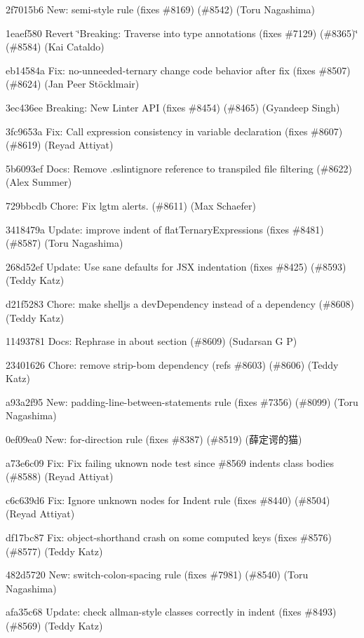 \begin{DoxyItemize}
\item 2f7015b6 New\+: semi-\/style rule (fixes \#8169) (\#8542) (Toru Nagashima)
\item 1eaef580 Revert \char`\"{}\+Breaking\+: Traverse into type annotations (fixes \#7129) (\#8365)\char`\"{} (\#8584) (Kai Cataldo)
\item eb14584a Fix\+: no-\/unneeded-\/ternary change code behavior after fix (fixes \#8507) (\#8624) (Jan Peer Stöcklmair)
\item 3ec436ee Breaking\+: New Linter A\+PI (fixes \#8454) (\#8465) (Gyandeep Singh)
\item 3fc9653a Fix\+: Call expression consistency in variable declaration (fixes \#8607) (\#8619) (Reyad Attiyat)
\item 5b6093ef Docs\+: Remove .eslintignore reference to transpiled file filtering (\#8622) (Alex Summer)
\item 729bbcdb Chore\+: Fix lgtm alerts. (\#8611) (Max Schaefer)
\item 3418479a Update\+: improve indent of {\ttfamily flat\+Ternary\+Expressions} (fixes \#8481) (\#8587) (Toru Nagashima)
\item 268d52ef Update\+: Use sane defaults for J\+SX indentation (fixes \#8425) (\#8593) (Teddy Katz)
\item d21f5283 Chore\+: make shelljs a dev\+Dependency instead of a dependency (\#8608) (Teddy Katz)
\item 11493781 Docs\+: Rephrase in about section (\#8609) (Sudarsan G P)
\item 23401626 Chore\+: remove strip-\/bom dependency (refs \#8603) (\#8606) (Teddy Katz)
\item a93a2f95 New\+: padding-\/line-\/between-\/statements rule (fixes \#7356) (\#8099) (Toru Nagashima)
\item 0ef09ea0 New\+: for-\/direction rule (fixes \#8387) (\#8519) (薛定谔的猫)
\item a73e6c09 Fix\+: Fix failing uknown node test since \#8569 indents class bodies (\#8588) (Reyad Attiyat)
\item c6c639d6 Fix\+: Ignore unknown nodes for Indent rule (fixes \#8440) (\#8504) (Reyad Attiyat)
\item df17bc87 Fix\+: object-\/shorthand crash on some computed keys (fixes \#8576) (\#8577) (Teddy Katz)
\item 482d5720 New\+: switch-\/colon-\/spacing rule (fixes \#7981) (\#8540) (Toru Nagashima)
\item afa35c68 Update\+: check allman-\/style classes correctly in indent (fixes \#8493) (\#8569) (Teddy Katz)

\end{DoxyItemize}
